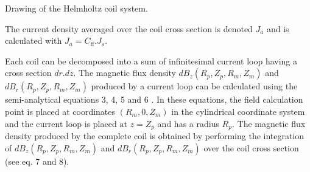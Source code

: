\documentclass{ws-jmrr}
\begin{document}
\begin{multicols}{2}
\begin{figurehere}
\begin{center}
	\caption{Drawing of the Helmholtz coil system.}
	\label{coils}
	\end{center}
\end{figurehere}
The current density averaged over the coil cross section is denoted $J_a$ and is calculated with $J_a=C_{\textrm{ff}}.J_s$.\par 
Each coil can be decomposed into a sum of infinitesimal current loop having a cross section $dr.dz$. The magnetic flux density $dB_z(R_p,Z_p,R_m,Z_m)$ and $dB_r(R_p,Z_p,R_m,Z_m)$ produced by a current loop can be calculated using the semi-analytical equations 3, 4, 5 and 6 \cite{simpson2001simple}. In these equations, the field calculation point is placed at coordinates $(R_m,0,Z_m)$ in the cylindrical coordinate system and the current loop is placed at $z=Z_p$ and has a radius $R_p$. The magnetic flux density produced by the complete coil is obtained by performing the integration of $dB_z(R_p,Z_p,R_m,Z_m)$ and $dB_r(R_p,Z_p,R_m,Z_m)$ over the coil cross section (see eq. 7 and 8).


\end{multicols}
\end{document}
